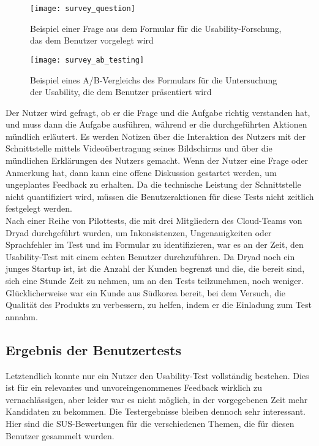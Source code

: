 \begin{figure}[H]
  \centering
  \texttt{[image: survey\_question]}
  \caption{Beispiel einer Frage aus dem Formular für die Usability-Forschung, das dem Benutzer vorgelegt wird}
  \label{fig:survey_question}
\end{figure}

\begin{figure}[H]
  \centering
  \texttt{[image: survey\_ab\_testing]}
  \caption{Beispiel eines A/B-Vergleichs des Formulars für die Untersuchung der Usability, die dem Benutzer präsentiert wird}
  \label{fig:survey_ab_testing}
\end{figure}

Der Nutzer wird gefragt, ob er die Frage und die Aufgabe richtig verstanden hat, und muss dann die Aufgabe ausführen, während er die durchgeführten Aktionen mündlich erläutert.
Es werden Notizen über die Interaktion des Nutzers mit der Schnittstelle mittels Videoübertragung seines Bildschirms und über die mündlichen Erklärungen des Nutzers gemacht.
Wenn der Nutzer eine Frage oder Anmerkung hat, dann kann eine offene Diskussion gestartet werden, um ungeplantes Feedback zu erhalten.
Da die technische Leistung der Schnittstelle nicht quantifiziert wird, müssen die Benutzeraktionen für diese Tests nicht zeitlich festgelegt werden.\\

Nach einer Reihe von Pilottests, die mit drei Mitgliedern des Cloud-Teams von Dryad durchgeführt wurden, um Inkonsistenzen, Ungenauigkeiten oder Sprachfehler im Test und im Formular zu identifizieren, war es an der Zeit, den Usability-Test mit einem echten Benutzer durchzuführen.
Da Dryad noch ein junges Startup ist, ist die Anzahl der Kunden begrenzt und die, die bereit sind, sich eine Stunde Zeit zu nehmen, um an den Tests teilzunehmen, noch weniger.
Glücklicherweise war ein Kunde aus Südkorea bereit, bei dem Versuch, die Qualität des Produkts zu verbessern, zu helfen, indem er die Einladung zum Test annahm.

\subsection{Ergebnis der Benutzertests} \label{sec:user_tests_results}

Letztendlich konnte nur ein Nutzer den Usability-Test vollständig bestehen.
Dies ist für ein relevantes und unvoreingenommenes Feedback wirklich zu vernachlässigen, aber leider war es nicht möglich, in der vorgegebenen Zeit mehr Kandidaten zu bekommen.
Die Testergebnisse bleiben dennoch sehr interessant.
Hier sind die \ac{SUS}-Bewertungen für die verschiedenen Themen, die für diesen Benutzer gesammelt wurden.

